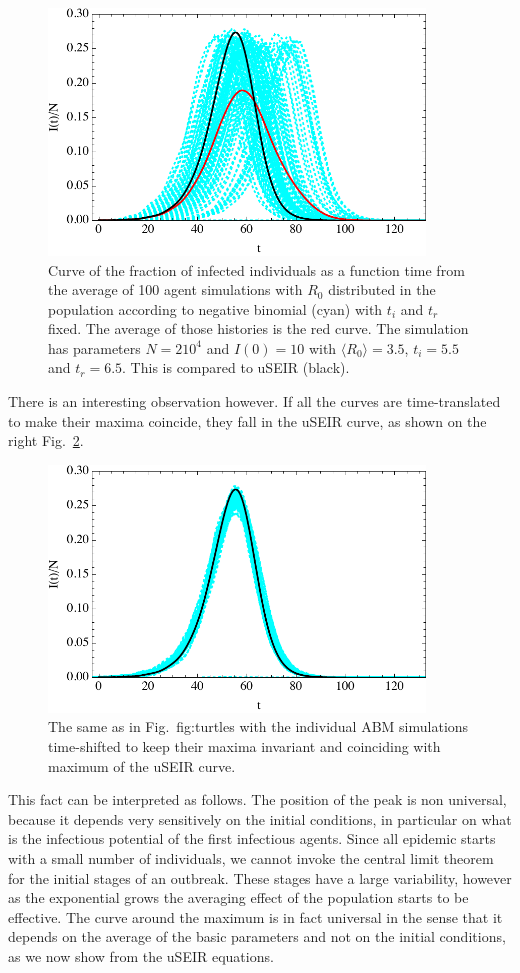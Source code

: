 \documentclass[a4paper,oneside,11pt]{article}
\begin{document}
 \begin{figure}[h!]
  \centering
\includegraphics[width=10cm]{turtlesraw.pdf}
  \caption{ Curve of the fraction of infected individuals as a function time from the average of 100 agent simulations with $R_0$ distributed in the population according to negative binomial (cyan) with $t_i$ and $t_r$ fixed. The average of those histories is the red curve. The simulation has parameters  $N= 2 10^4$ and $I(0)=10$ with $\langle R_0\rangle=3.5$, $t_i=5.5$ and $t_r=6.5$. This is compared to uSEIR (black).}
  \label{fig:turtlesraw}
   \end{figure}
  There is an interesting observation however. If all the curves are time-translated  to make their maxima coincide, they fall in the uSEIR curve, as shown on the right Fig.~\ref{fig:turtlesshift}.
  \begin{figure}[h!]
  \centering
\includegraphics[width=10cm]{turtlesshift.pdf}
  \caption{ The same as in Fig.~{fig:turtles} with the individual ABM simulations time-shifted to keep their maxima invariant and coinciding with maximum of the uSEIR curve.}
  \label{fig:turtlesshift}
   \end{figure}

  This fact can be interpreted as follows. The position of the peak is non universal, because it depends very sensitively on the initial conditions, in particular on what is the infectious potential of the first infectious agents. Since all epidemic starts with a small number of individuals, we cannot invoke the central limit theorem for the initial stages of an outbreak. These stages have a large variability, however as the exponential grows the averaging effect of the population starts to be effective. The curve around the maximum is in fact universal in the sense that it depends on the average of the basic parameters and not on the initial conditions, as we now show from the uSEIR equations.
\end{document}
